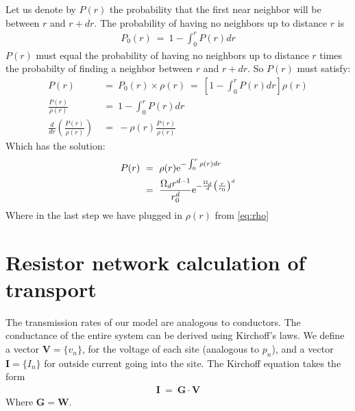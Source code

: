 Let us denote by $P(r)$ the probability that the first near neighbor will be
between $r$ and $r+dr$. The probability of having no neighbors up to distance $r$ is
%
\begin{align}
P_0(r) \ =\  1 - \int_0^r P(r)dr
\end{align}
$P(r)$ must equal the probability of having no neighbors up to distance $r$ times
the probabilty of finding a neighbor between $r$ and $r+dr$. So $P(r)$ must satisfy:
%
\begin{align}
P(r) \ &=\ P_0(r) \times \rho(r) \ =\ \left[ 1-\int_0^r P(r)dr \right] \rho(r) \\
\frac{P(r)}{\rho(r)}\ &=\  1-\int_0^r P(r)dr \\
\frac{d}{dr}\left(\frac{P(r)}{\rho(r)}\right) \ &=\ -\rho(r)\frac{ P(r)}{\rho(r)}
\end{align}
%
Which has the solution:
%
\begin{align}
P(r) \ &=\ \rho(r) \mbox{e}^{-\int_0^r \rho(r) dr} \\
       &=\ \frac{\Omega_d r^{d-1}}{r_0^d} \mbox{e}^{-\frac{\Omega_d}{d} \left(\frac{r}{r_0}\right)^d}  \label{eq:spacing_dist}
\end{align}
%
Where in the last step we have plugged in $\rho(r)$ from \autoref{eq:rho}
%


%
%
%
%




\section{Resistor network calculation of transport}\label{sec:resnet}

The transmission rates of our model are analogous to
conductors. The conductance of the entire system can be derived
using Kirchoff's laws. 
We define a vector $\bm{V} = \{v_n\}$, for the voltage 
of each site (analogous to $p_n$), and a vector
$\bm{I} = \{I_n\}$ for outside current going into the site.
The Kirchoff equation takes the form
%
\begin{align}
\bm{I}\ =\ \bm{G}\cdot \bm{V}
\end{align}
%
Where $\bm{G} = \bm{W}$.


